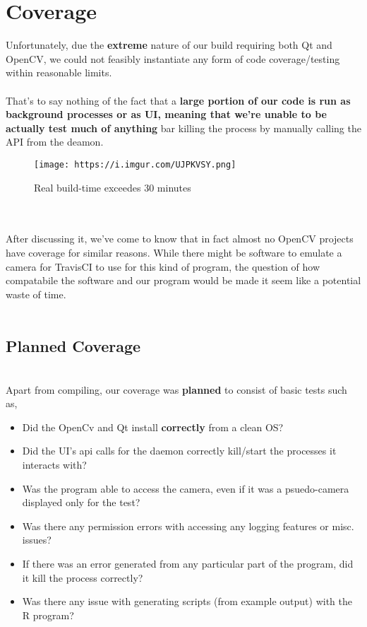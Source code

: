 \documentclass[12pt]{article}
\begin{document}
\section*{Coverage}
Unfortunately, due the \textbf{extreme} nature of our build requiring both Qt and OpenCV, we could not feasibly instantiate any form of code coverage/testing within reasonable limits.\\
\\
That's to say nothing of the fact that a \textbf{large portion of our code is run as background processes or as UI, meaning that we're unable to be actually test much of anything} bar killing the process by manually calling the API from the deamon.
\\\begin{figure}[width=0.25\textwidth]
    \centering
    \texttt{[image: https://i.imgur.com/UJPKVSY.png]}
    \caption{Real build-time exceedes 30 minutes}
\end{figure}
\\
\\After discussing it, we've come to know that in fact almost no OpenCV projects have coverage for similar reasons. While there might be software to emulate a camera for TravisCI to use for this kind of program, the question of how compatabile the software and our program would be made it seem like a potential waste of time.\\
\pagebreak
\\\subsection*{Planned Coverage}
\\Apart from compiling, our coverage was \textbf{planned} to consist of basic tests such as,
\\\begin{itemize}
  \\\item Did the OpenCv and Qt install \textbf{correctly} from a clean OS?
  \\\item Did the UI's api calls for the daemon correctly kill/start the processes it interacts with?
  \\\item Was the program able to access the camera, even if it was a psuedo-camera displayed only for the test?
  \\\item Was there any permission errors with accessing any logging features or misc. issues?
  \\\item If there was an error generated from any particular part of the program, did it kill the process correctly?
  \\\item Was there any issue with generating scripts (from example output) with the R program? 
\end{itemize}
\pagebreak
\end{document}
